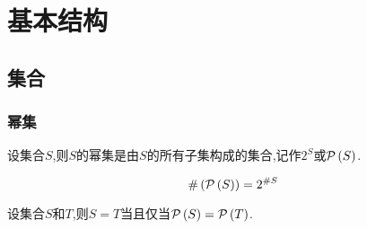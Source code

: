 \newpage
\chapter{基本结构}
\thispagestyle{fancy}
\section{集合}
\subsection{幂集}
\begin{formal}
\begin{definition}[幂集的定义]\label{def:幂集的定义}
    设集合$S$,则$S$的幂集是由$S$的所有子集构成的集合,记作$2^S$或$\mathcal{P}\left(S\right)$.
\end{definition}
\end{formal}
\begin{formal}
    \begin{theorem}[幂集的大小]\label{thm:幂集的大小}
        \[
        \#\left(
        \mathcal{P}\left(S\right)
        \right)=2^{\#S}
        \]
    \end{theorem}
\end{formal}
\begin{formal}
    \begin{theorem}[幂集的相等与集合的相等]\label{thm:幂集的相等与集合的相等}
        设集合$S$和$T$,则$S=T$当且仅当$\mathcal{P}\left(S\right)=\mathcal{P}\left(T\right)$.
    \end{theorem}
\end{formal}
